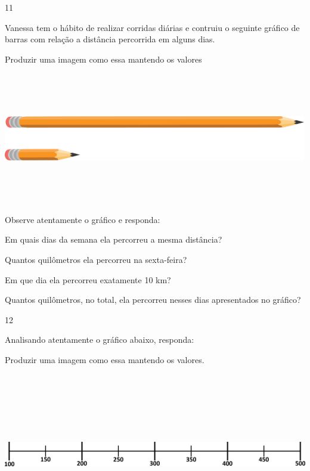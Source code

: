 \begin{escolha}
\begin{escolha}

\num{11}

Vanessa tem o hábito de realizar corridas diárias e contruiu o seguinte
gráfico de barras com relação a distância percorrida em alguns dias.

Produzir uma imagem como essa mantendo os valores

\includegraphics[width=5.22545in,height=2.25853in]{media/image101.png}

Observe atentamente o gráfico e responda:

\begin{escolha}
\item
  Em quais dias da semana ela percorreu a mesma distância?

\item
  Quantos quilômetros ela percorreu na sexta-feira?

\item
  Em que dia ela percorreu exatamente 10 km?

\item
  Quantos quilômetros, no total, ela percorreu nesses dias apresentados
  no gráfico?
\end{escolha}

\num{12}

Analisando atentamente o gráfico abaixo, responda:

Produzir uma imagem como essa mantendo os valores.

\includegraphics[width=5.90556in,height=2.79931in]{media/image102.png}


\end{escolha}
\end{escolha}
